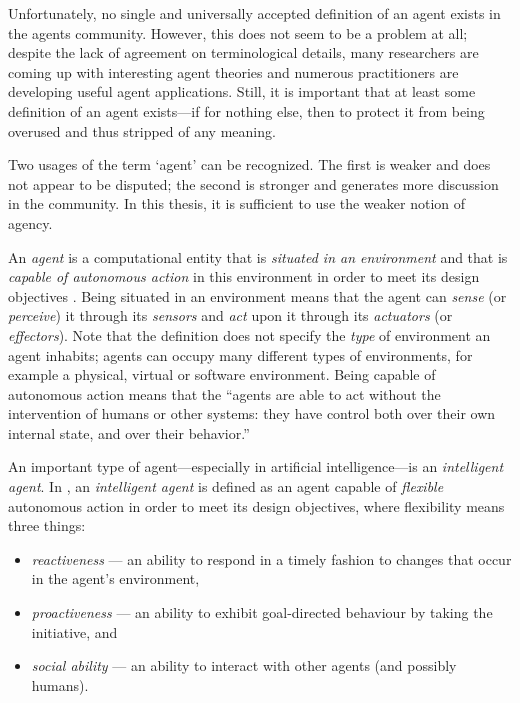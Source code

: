 Unfortunately, no single and universally accepted definition of an agent exists in the agents community.
However, this does not seem to be a problem at all; despite the lack of agreement on terminological details, many researchers are coming up with interesting agent theories and numerous practitioners are developing useful agent applications.
Still, it is important that at least some definition of an agent exists---if for nothing else, then to protect it from being overused and thus stripped of any meaning.

Two usages of the term `agent' can be recognized.
The first is weaker and does not appear to be disputed; the second is stronger and generates more discussion in the community.
In this thesis, it is sufficient to use the weaker notion of agency.

An \textit{agent} is a computational entity that is \textit{situated in an environment} and that is \textit{capable of autonomous action} in this environment in order to meet its design objectives \cite{Wooldridge02}.
Being situated in an environment means that the agent can \textit{sense} (or \textit{perceive}) it through its \textit{sensors} and \textit{act} upon it through its \textit{actuators} (or \textit{effectors}).
Note that the definition does not specify the \textit{type} of environment an agent inhabits; agents can occupy many different types of environments, for example a physical, virtual or software environment.
Being capable of autonomous action means that the ``agents are able to act without the intervention of humans or other systems: they have control both over their own internal state, and over their behavior.'' \cite{Wooldridge02}

An important type of agent---especially in artificial intelligence---is an \textit{intelligent agent}.
In \cite{Wooldridge02}, an \textit{intelligent agent} is defined as an agent capable of \textit{flexible} autonomous action in order to meet its design objectives, where flexibility means three things:
\begin{itemize}
	\item \textit{reactiveness} --- an ability to respond in a timely fashion to changes that occur in the agent's environment,
	\item \textit{proactiveness} --- an ability to exhibit goal-directed behaviour by taking the initiative, and
	\item \textit{social ability} --- an ability to interact with other agents (and possibly humans).
\end{itemize}

